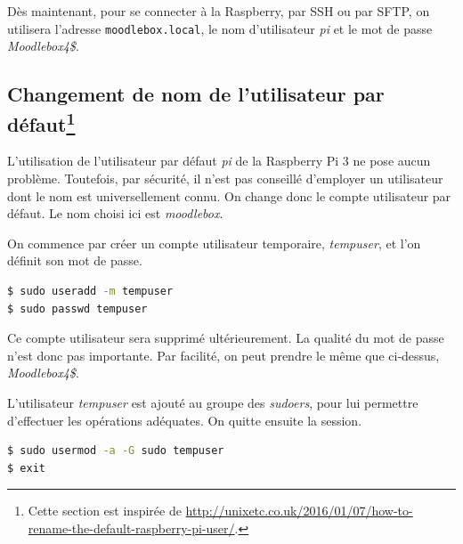 \documentclass[11pt]{article}
\begin{document}
Dès maintenant, pour se connecter à la Raspberry, par SSH ou par SFTP, on utilisera l'adresse \lstinline{moodlebox.local}, le nom d'utilisateur \emph{pi} et le mot de passe \emph{Moodlebox4\$}.

\subsection[Changement de nom de l'utilisateur par défaut]{Changement de nom de l'utilisateur par défaut\footnote{Cette section est inspirée de \url{http://unixetc.co.uk/2016/01/07/how-to-rename-the-default-raspberry-pi-user/}.}}

L'utilisation de l'utilisateur par défaut \emph{pi} de la Raspberry Pi 3 ne pose aucun problème. Toutefois, par sécurité, il n'est pas conseillé d'employer un utilisateur dont le nom est universellement connu. On change donc le compte utilisateur par défaut. Le nom choisi ici est \emph{moodlebox}.

On commence par créer un compte utilisateur temporaire, \emph{tempuser}, et l'on définit son mot de passe.
\begin{lstlisting}[language=bash]
$ sudo useradd -m tempuser
$ sudo passwd tempuser
\end{lstlisting}

Ce compte utilisateur sera supprimé ultérieurement. La qualité du mot de passe n'est donc pas importante. Par facilité, on peut prendre le même que ci-dessus, \emph{Moodlebox4\$}.

L'utilisateur \emph{tempuser} est ajouté au groupe des \emph{sudoers}, pour lui permettre d'effectuer les opérations adéquates. On quitte ensuite la session.

\begin{lstlisting}[language=bash]
$ sudo usermod -a -G sudo tempuser
$ exit
\end{lstlisting}
\end{document}
